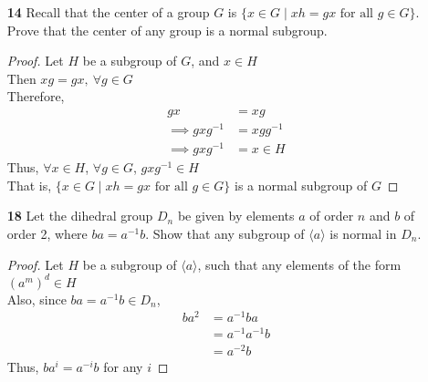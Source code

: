 \documentclass[paper=usletter, fontsize=12pt]{article}
\begin{document}
\begin{itemize}
\begin{enumerate}
\begin{proof}
            \end{proof}

            \item[\textbf{14}] Recall that the center of a group $G$ is $\{x
            \in G \mid xh=gx \text{ for all } g \in G\}$. Prove that the center
            of any group is a normal subgroup.
            \begin{proof}

                Let $H$ be a subgroup of $G$, and $x\in H$\\
                Then $xg=gx, \ \forall g \in G$\\
                Therefore,
                \begin{align*}
                    gx & = xg \\
                    \implies gxg^{-1} & = xgg^{-1}\\
                    \implies gxg^{-1} & = x \in H
                \end{align*}
                Thus, $\forall x \in H$, $\forall g \in G$, $gxg^{-1} \in H$\\
                That is, $\{x \in G \mid xh=gx \text{ for all } g \in G\}$ is a
                normal subgroup of $G$ \qedhere

            \end{proof}

            \item[\textbf{18}] Let the dihedral group $D_n$ be given by
            elements $a$ of order $n$ and $b$ of order 2, where $ba=a^{-1}b$.
            Show that any subgroup of $\langle a\rangle$ is normal in $D_n$.
            \begin{proof}

                Let $H$ be a subgroup of $\langle a\rangle$, such that any
                elements of the form $(a^m)^d\in H$\\
                Also, since $ba=a^{-1}b\in D_n$,
                \begin{align*}
                    ba^2 & = a^{-1}ba \\
                    & = a^{-1}a^{-1}b \\
                    & = a^{-2}b
                \end{align*}
                Thus, $ba^i=a^{-i}b$ for any $i$

            \end{proof}

        \end{enumerate}


\end{itemize}
\end{document}
